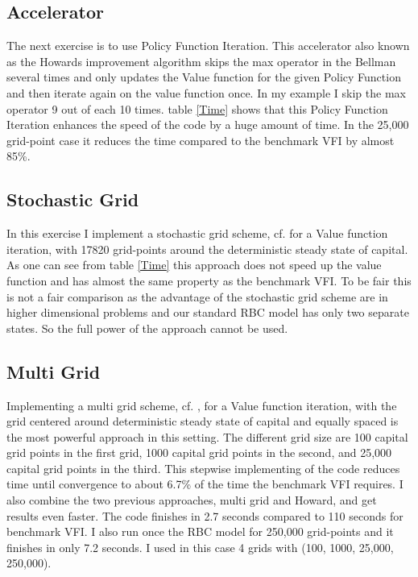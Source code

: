 \documentclass[a4paper,12pt]{article}
\begin{document}
\subsection*{Accelerator}

The next exercise is to use Policy Function Iteration. This accelerator also known as the Howards improvement algorithm skips the max operator in the Bellman several times and only updates the Value function for the given Policy Function and then iterate again on the value function once. In my example I skip the max operator 9 out of each 10 times. table \ref{Time} shows that this Policy Function Iteration enhances the speed of the code by a huge amount of time. In the 25,000 grid-point case it reduces the time compared to the benchmark VFI by almost 85\%. 

\subsection*{Stochastic Grid}

In this exercise I implement a stochastic grid scheme, cf.  for a Value function iteration, with 17820 grid-points around the deterministic steady state of capital. As one can see from table  \ref{Time} this approach does not speed up the value function and has almost the same property as the benchmark VFI. To be fair this is not a fair comparison as the advantage of the stochastic grid scheme are in higher dimensional problems and our standard RBC model has only two separate states. So the full power of the approach cannot be used.

\subsection*{Multi Grid}

Implementing a multi grid scheme, cf. , for a Value function iteration, with the grid centered around deterministic steady state of capital and equally spaced is the most powerful approach in this setting. The different grid size are 100 capital grid points in the first grid, 1000 capital grid points in the second, and 25,000 capital grid points in the third. This stepwise implementing of the code reduces time until convergence to about 6.7\% of the time the benchmark VFI requires. 
I also combine the two previous approaches, multi grid and Howard, and get results even faster. The code finishes in 2.7 seconds compared to 110 seconds for benchmark VFI. I also run once the RBC model for 250,000 grid-points and it finishes in only 7.2 seconds. I used in this case 4 grids with (100, 1000, 25,000, 250,000). 
\end{document}
